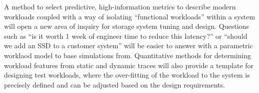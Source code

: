 


A method to select
predictive, high-information metrics to describe modern workloads coupled with a way of isolating ``functional workloads'' within a system will open a new area of inquiry for storage system tuning and design.  Questions such as ``is it worth 1 week of engineer time to reduce this latency?'' or ``should we add an SSD to a customer system'' will be easier to answer with a parametric worklaod model to base simulations from.%
%
Quantitative methods for determining workload features from static and dynamic
traces will also provide a template for designing test workloads, where the
over-fitting of the workload to the system is precisely defined and can be
adjusted based on the design requirements.




